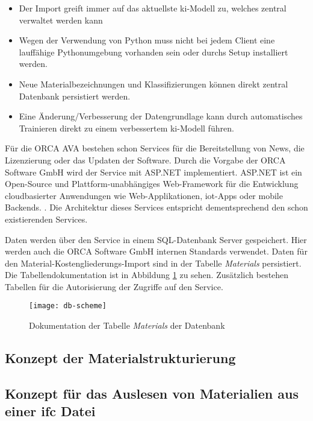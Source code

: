 \begin{itemize}
	\setlength\itemsep{0.3em}
	\item Der Import greift immer auf das aktuellste \ac{ki}-Modell zu, welches zentral verwaltet werden kann
	\item Wegen der Verwendung von Python muss nicht bei jedem Client eine lauffähige Pythonumgebung vorhanden sein oder durchs Setup installiert werden.
	\item Neue Materialbezeichnungen und Klassifizierungen können direkt zentral Datenbank persistiert werden.
	\item Eine Änderung/Verbesserung der Datengrundlage kann durch automatisches Trainieren direkt zu einem verbessertem \ac{ki}-Modell führen.
\end{itemize}
Für die ORCA AVA bestehen schon Services für die Bereitstellung von News, die Lizenzierung oder das Updaten der Software. Durch die Vorgabe der ORCA Software GmbH wird der Service mit ASP.NET implementiert. ASP.NET ist ein Open-Source und Plattform-unabhängiges Web-Framework für die Entwicklung cloudbasierter Anwendungen wie Web-Applikationen, \ac{iot}-Apps oder mobile Backends. \citep{asp-net}. Die Architektur dieses Services entspricht dementsprechend den schon existierenden Services.

Daten werden über den Service in einem SQL-Datenbank Server gespeichert. Hier werden auch die ORCA Software GmbH internen Standards verwendet. Daten für den Material-Kostengliederungs-Import sind in der Tabelle \textit{Materials} persistiert. Die Tabellendokumentation ist in Abbildung \ref{fig:db-scheme} zu sehen. Zusätzlich bestehen Tabellen für die Autorisierung der Zugriffe auf den Service.

\begin{figure}[H]
	\centering
	\texttt{[image: db-scheme]}
	\caption[Dokumentation]{Dokumentation der Tabelle \textit{Materials} der Datenbank}
	\label{fig:db-scheme}
\end{figure}

\subsection{Konzept der Materialstrukturierung}
\label{c:conception:architecture:structuring}

\subsection{Konzept für das Auslesen von Materialien aus einer \ac{ifc} Datei}
\label{c:conception:architecture:ifc-material-extraction}
